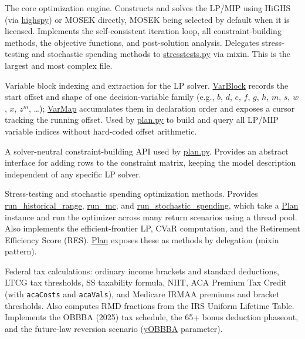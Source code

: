 \documentclass[fleqn,12pt]{report}
\newcommand{\code}[1]{\url{#1}}
\begin{document}
\begin{sloppypar}
\begin{description}[style=nextline, leftmargin=2.5cm, font=\ttfamily]

\item[plan.py]
The core optimization engine.
Constructs and solves the LP/MIP using HiGHS (via \code{highspy}) or MOSEK directly,
MOSEK being selected by default when it is licensed.
Implements the self-consistent iteration loop, all constraint-building methods,
the objective functions, and post-solution analysis.
Delegates stress-testing and stochastic spending methods to \code{stresstests.py} via mixin.
This is the largest and most complex file.

\item[varmap.py]
Variable block indexing and extraction for the LP solver.
\code{VarBlock} records the start offset and shape of one decision-variable family
(e.g., $b$, $d$, $e$, $f$, $g$, $h$, $m$, $s$, $w$, $x$, $z^m$, \ldots);
\code{VarMap} accumulates them in declaration order and exposes a cursor tracking the
running offset.
Used by \code{plan.py} to build and query all LP/MIP variable indices without
hard-coded offset arithmetic.

\item[abcapi.py]
A solver-neutral constraint-building API used by \code{plan.py}.
Provides an abstract interface for adding rows to the constraint matrix,
keeping the model description independent of any specific LP solver.

\item[stresstests.py]
Stress-testing and stochastic spending optimization methods.
Provides \code{run_historical_range}, \code{run_mc}, and \code{run_stochastic_spending},
which take a \code{Plan} instance and run the optimizer across many return scenarios
using a thread pool.
Also implements the efficient-frontier LP, CVaR computation, and the Retirement
Efficiency Score (RES).
\code{Plan} exposes these as methods by delegation (mixin pattern).

\item[tax\_federal.py]
Federal tax calculations: ordinary income brackets and standard deductions,
LTCG tax thresholds, SS taxability formula, NIIT, ACA Premium Tax Credit
(with \texttt{acaCosts} and \texttt{acaVals}), and Medicare IRMAA premiums and bracket thresholds.
Also computes RMD fractions from the IRS Uniform Lifetime Table.
Implements the OBBBA (2025) tax schedule, the 65+ bonus deduction phaseout,
and the future-law reversion scenario (\code{yOBBBA} parameter).


\end{description}
\end{sloppypar}
\end{document}
